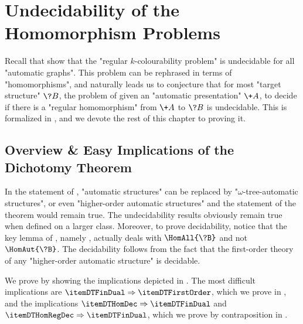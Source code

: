 \section{Undecidability of the Homomorphism Problems}
\label{sec:dichotomy-undecidability}

Recall that  show that the "regular $k$-colourability problem"
is undecidable for all "automatic graphs". This problem can be rephrased in terms
of "homomorphisms", and naturally leads us to conjecture that
for most "target structure" $\?B$, the problem of given an "automatic presentation" $\+A$,
to decide if there is a "regular homomorphism" from $\+A$ to $\?B$ is undecidable.
This is formalized in ,
and we devote the rest of this chapter to proving it.

\subsection{Overview \& Easy Implications of the Dichotomy Theorem}
\label{sec:dichotomy-overview}

\begin{mainstatement}
	\DichotomyThmDichotomyAutomatic
\end{mainstatement}

\begin{remark}
	In the statement of ,
	"automatic structures" can be replaced by
	"$\omega$-tree-automatic structures", or even
	"higher-order automatic structures"
	and the statement of the theorem would remain true.
	The undecidability results obviously remain true when defined on a larger class.
	Moreover, to prove decidability, notice that the key lemma of ,
	namely ,
	actually deals with $\HomAll{\?B}$ and not $\HomAut{\?B}$.
	The decidability follows from the fact that the first-order theory of any
	"higher-order automatic structure" is decidable.
\end{remark}


\begin{marginfigure}
	\centering
	\begin{tikzpicture}
		
	\end{tikzpicture}
	\caption{\AP\label{fig:dichotomy-overview}Implications shown in the chapter to prove
	.}
\end{marginfigure}
We prove  by showing the
implications depicted in .
The most difficult implications are $\itemDTFinDual \Rightarrow \itemDTFirstOrder$,
which we prove in , and the implications
$\itemDTHomDec \Rightarrow \itemDTFinDual$ and $\itemDTHomRegDec \Rightarrow \itemDTFinDual$,
which we prove by contraposition in .

